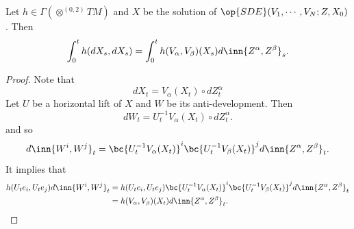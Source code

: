 \begin{prop}
    Let $h \in \Gamma(\otimes^{(0,2)}TM)$ and $X$ be the solution of $\op{SDE}(V_1,\cdots,V_N;Z,X_0)$. Then
    \begin{equation*}
        \int_0^th(dX_s,dX_s) = \int_0^th(V_\alpha,V_\beta)(X_s)d\inn{Z^\alpha,Z^\beta}_s.
    \end{equation*}
\end{prop}
\begin{proof}
    Note that
    \begin{equation*}
        dX_t = V_\alpha(X_t) \circ dZ^\alpha_t
    \end{equation*}
    Let $U$ be a horizontal lift of $X$ and $W$ be its anti-development. Then
    \begin{equation*}
        dW_t = U_t^{-1}V_{\alpha}(X_t) \circ dZ^\alpha_t.
    \end{equation*}
    and so
    \begin{equation*}
        d\inn{W^i,W^j}_t = \bc{U_t^{-1}V_{\alpha}(X_t)}^i\bc{U_t^{-1}V_{\beta}(X_t)}^jd\inn{Z^\alpha,Z^\beta}_t.
    \end{equation*}
    It implies that
    \begin{align*}
        h(U_te_i,U_te_j) d\inn{W^i,W^j}_t &= h(U_te_i,U_te_j)\bc{U_t^{-1}V_{\alpha}(X_t)}^i\bc{U_t^{-1}V_{\beta}(X_t)}^jd\inn{Z^\alpha,Z^\beta}_t \\
        &= h(V_\alpha,V_\beta)(X_t)d\inn{Z^\alpha,Z^\beta}_t. \qedhere
    \end{align*}
\end{proof}

